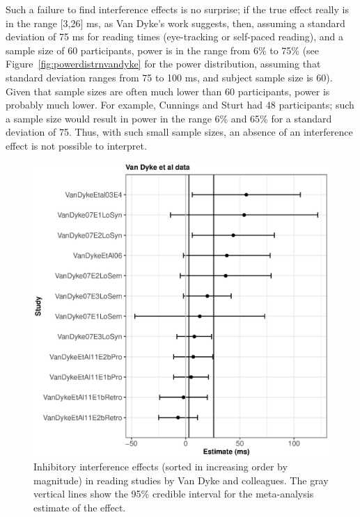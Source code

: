 \documentclass{cambridge7A}\usepackage[]{graphicx}\usepackage[]{color}
\makeatletter
\def\maxwidth{ %
  \ifdim\Gin@nat@width>\linewidth
    \linewidth
  \else
    \Gin@nat@width
  \fi
}
\newenvironment{knitrout}{}{} %
\makeatother
\begin{document}
Such a failure to find interference effects is no surprise; if the true effect really is in the range [3,26] ms, as Van Dyke's work suggests, then, assuming a standard deviation of 75 ms for reading times (eye-tracking or self-paced reading), and a sample size of 60 participants, power is in the range from 6\% to 75\% (see Figure~\ref{fig:powerdistrnvandyke} for the power distribution, assuming that standard deviation ranges from 75 to 100 ms, and subject sample size is 60). Given that sample sizes are often much lower than 60 participants, power is probably much lower. 
For example, Cunnings and Sturt had 48 participants; such a sample size would result in  power in the range 6\% and 65\% for a standard deviation of 75.
Thus, with such small sample sizes, an absence of an interference effect is not possible to interpret.

\begin{figure}[!htbp]
\centering
\begin{knitrout}
\color{fgcolor}

{\centering \includegraphics[width=\maxwidth]{figures/fig-jvddataplot-1} 

}



\end{knitrout}
\caption{Inhibitory interference effects (sorted in increasing order by magnitude) in reading studies by Van Dyke and colleagues. The gray vertical lines show the 95\%  credible interval for the meta-analysis estimate  of the effect.}\label{fig:jvddataplot}
\end{figure}
\end{document}
